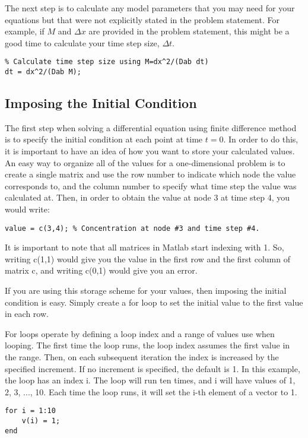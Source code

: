 \documentclass[11pt]{article}
\begin{document}
The next step is to calculate any model parameters that you may need for your
equations but that were not explicitly stated in the problem statement. For
example, if $M$ and $\Delta x$ are provided in the problem statement, this
might be a good time to calculate your time step size, $\Delta t$.
\begin{lstlisting}
% Calculate time step size using M=dx^2/(Dab dt)
dt = dx^2/(Dab M);
\end{lstlisting}

\subsection{Imposing the Initial Condition}
The first step when solving a differential equation using finite difference
method is to specify the initial condition at each point at time $t=0$. In
order to do this, it is important to have an idea of how you want to store your
calculated values. An easy way to organize all of the values for a
one-dimensional problem is to create a single matrix and use the row number to
indicate which node the value corresponds to, and the column number to specify
what time step the value was calculated at. Then, in order to obtain the value
at node 3 at time step 4, you would write:
\begin{lstlisting}
value = c(3,4); % Concentration at node #3 and time step #4.
\end{lstlisting}
It is important to note that all matrices in Matlab start indexing with 1. So,
writing c(1,1) would give you the value in the first row and the first column
of matrix c, and writing c(0,1) would give you an error.

If you are using this storage scheme for your values, then imposing the initial
condition is easy. Simply create a for loop to set the initial value to the first value in each row.

For loops operate by defining a loop index and a range of values use when
looping. The first time the loop runs, the loop index assumes the first value
in the range. Then, on each subsequent iteration the index is increased by the
specified increment. If no increment is specified, the default is 1.
In this example, the loop has an index i. The loop will run ten times, and i will have values of 1, 2, 3, ..., 10. Each time the loop runs, it will set the i-th element of a vector to 1.
\begin{lstlisting}
for i = 1:10
    v(i) = 1;
end
\end{lstlisting}
\end{document}
